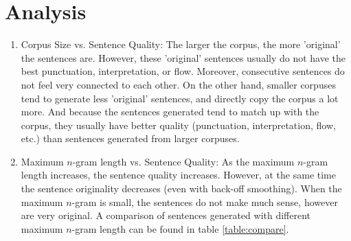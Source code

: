 \documentclass[11pt]{article}
\begin{document}
\section{Analysis}
\begin{enumerate}
\item Corpus Size vs. Sentence Quality: The larger the corpus, the more 'original' the sentences are. However, these 'original' sentences usually do not have the best punctuation, interpretation, or flow. Moreover, consecutive sentences do not feel very connected to each other. On the other hand, smaller corpuses tend to generate less 'original' sentences, and directly copy the corpus a lot more. And because the sentences generated tend to match up with the corpus, they usually have better quality (punctuation, interpretation, flow, etc.) than sentences generated from larger corpuses.
\item Maximum $n$-gram length vs. Sentence Quality: As the maximum $n$-gram length increases, the sentence quality increases. However, at the same time the sentence originality decreases (even with back-off smoothing). When the maximum $n$-gram is small, the sentences do not make much sense, however are very original. A comparison of sentences generated with different maximum $n$-gram length can be found in table \ref{table:compare}.


\end{enumerate}
\end{document}
